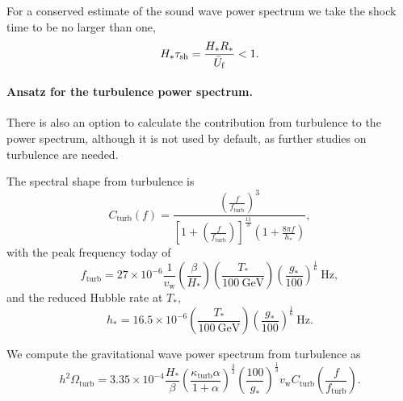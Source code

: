 \documentclass[10pt]{article}
\begin{document}
For a conserved estimate of the sound wave power spectrum we take the shock time to be no larger than one,
\begin{equation}
    H_*\tau_\mathrm{sh}=\frac{H_*R_*}{\Bar{U}_\mathrm{f}}<1.
\end{equation}

\paragraph{Ansatz for the turbulence power spectrum.}
There is also an option to calculate the contribution from turbulence to the power spectrum, although it is not used by default, as further studies on turbulence are needed.

The spectral shape from turbulence is \cite{weir18}
\begin{equation}
    C_\mathrm{turb}(f) = \frac{\left(\frac{f}{f_\mathrm{turb}}\right)^3}{\left[1+\left(\frac{f}{f_\mathrm{turb}}\right)\right]^{\frac{11}{3}} \left(1+\frac{8\pi f}{h_*}\right)},
\end{equation}
with the peak frequency today of
\begin{equation}
    f_\mathrm{turb} = 27\times10^{-6} \frac{1}{v_\mathrm{w}} \left(\frac{\beta}{H_*}\right) \left(\frac{T_*}{100 \ \mathrm{GeV}}\right) \left(\frac{g_*}{100}\right)^{\frac{1}{6}} \ \mathrm{Hz},
\end{equation}
and the reduced Hubble rate at $T_*$,
\begin{equation}
    h_* = 16.5\times10^{-6} \left(\frac{T_*}{100 \ \mathrm{GeV}}\right) \left(\frac{g_*}{100}\right)^{\frac{1}{6}} \ \mathrm{Hz}.
\end{equation}

We compute the gravitational wave power spectrum from turbulence as \cite{weir18}
\begin{equation}
    h^2\Omega_\mathrm{turb} = 3.35\times10^{-4} \frac{H_*}{\beta} \left(\frac{\kappa_\mathrm{turb}\alpha}{1+\alpha}\right)^{\frac{3}{2}} \left(\frac{100}{g_*}\right)^{\frac{1}{3}} v_\mathrm{w} C_\mathrm{turb}\left(\frac{f}{f_\mathrm{turb}}\right).
\end{equation}

\end{document}
